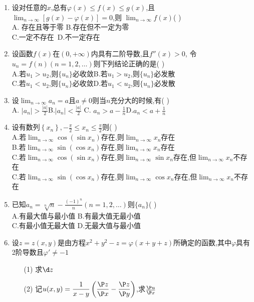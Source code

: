 \documentclass[12pt, a4paper, oneside, UTF8]{ctexbook}
\begin{document}
\begin{enumerate}
    \item 设对任意的$x$,总有$\varphi(x)\leq f(x)\leq g(x)$,且$\displaystyle \lim_{n\to\infty}\left[g(x)-\varphi(x)\right]=0$,则
    $\displaystyle\lim_{n\to\infty}f(x)$(   )  \\
    A. 存在且等于零 \qquad B.存在但不一定为零 \\
    C.一定不存在\qquad\quad\ D.不一定存在 

    \item 设函数$f(x)$在$(0,+\infty)$内具有二阶导数,且$f''(x)>0$,
    令$u_n=f(n)(n=1,2,\ldots)$则下列结论正确的是(  ) \\
    A.若$u_1>u_2$,则$\{u_n\}$必收敛\qquad B.若$u_1>u_2$,则$\{u_n\}$必发散\\
    C.若$u_1<u_2$,则$\{u_n\}$必收敛\qquad D.若$u_1<u_2$,则$\{u_n\}$必发散

    \item  设$\displaystyle\lim_{n\to\infty}a_n=a$且$a\neq 0$则当$n$充分大的时候,有(   )\\
    A. $\left|a_n\right|>\frac{\left|a\right|}{2}$\qquad B.$\left|a_n\right|<\frac{\left|a\right|}{2}$\qquad
    C. $a_n>a-\frac{1}{n}$\qquad D.$a_n<a+\frac{1}{n}$

    \item 设有数列$\left\{x_n\right\},-\frac{\pi}{2}\leq x_n\leq \frac{\pi}{2}$则(    )\\
    A.若$\displaystyle\lim_{n\to\infty}\cos{(\sin{x_n})}$存在,则$\displaystyle\lim_{n\to\infty}x_n$存在 \\
    B.若$\displaystyle\lim_{n\to\infty}\sin{(\cos{x_n})}$存在,则$\displaystyle\lim_{n\to\infty}x_n$存在 \\
    C.若$\displaystyle\lim_{n\to\infty}\cos{(\sin{x_n})}$存在,则$\displaystyle\lim_{n\to\infty}\sin{x_n}$存在,但$\displaystyle\lim_{n\to\infty}x_n$不存在 \\
    C.若$\displaystyle\lim_{n\to\infty}\sin{(\cos{x_n})}$存在,则$\displaystyle\lim_{n\to\infty}\cos{x_n}$存在,但$\displaystyle\lim_{n\to\infty}x_n$不存在

    \item 已知$a_n=\sqrt[n]{n}-\frac{(-1)^n}{n}(n=1,2,\ldots)$则$\{a_n\}$(    )\\
    A.有最大值与最小值 \qquad B.有最大值无最小值\\ 
    C.有最小值无最大值 \qquad D.无最大值与最小值

    \item \bl[2] 设$z=z(x,y)$是由方程$x^2+y^2-z=\varphi(x+y+z)$所确定的函数,其中$\varphi$具有2阶导数且$\varphi'\neq -1$ 
    \begin{enumerate}
        \item [(1)] 求$\d z$ 
        \item [(2)] 记$\displaystyle u(x,y)=\frac{1}{x-y}\left(\frac{\P z}{\P x} - \frac{\P z}{\P y}\right)$,求$\frac{\P u}{\P x}$
    \end{enumerate}
\end{enumerate}
\end{document}
